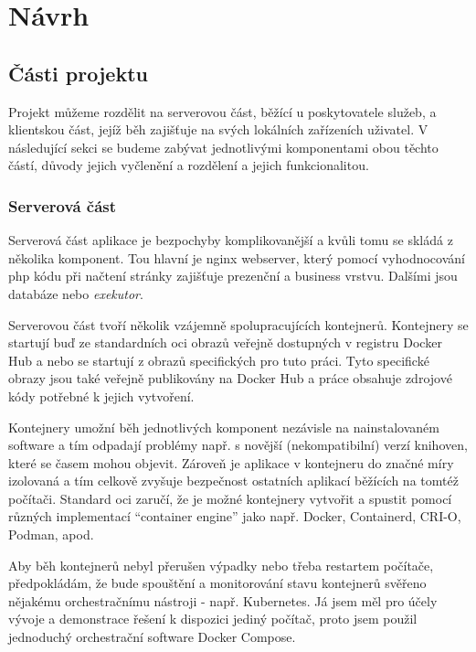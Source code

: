 \chapter{Návrh}

\section{Části projektu}
Projekt můžeme rozdělit na serverovou část, běžící u poskytovatele služeb, a klientskou část, jejíž běh zajišťuje na svých lokálních zařízeních uživatel. V následující sekci se budeme zabývat jednotlivými komponentami obou těchto částí, důvody jejich vyčlenění a rozdělení a jejich funkcionalitou.

\subsection{Serverová část}
Serverová část aplikace je bezpochyby komplikovanější a kvůli tomu se skládá z několika komponent. Tou hlavní je \acrshort{nginx} webserver, který pomocí vyhodnocování \acrshort{php} kódu při načtení stránky zajišťuje prezenční a business vrstvu. Dalšími jsou databáze nebo \emph{exekutor}.

Serverovou část tvoří několik vzájemně spolupracujících kontejnerů. Kontejnery se startují buď ze standardních \acrshort{oci} obrazů veřejně dostupných v registru Docker Hub a nebo se startují z obrazů specifických pro tuto práci. Tyto specifické obrazy jsou také veřejně publikovány na Docker Hub a práce obsahuje zdrojové kódy potřebné k jejich vytvoření. 

Kontejnery umožní běh jednotlivých komponent nezávisle na nainstalovaném software a tím odpadají problémy např. s novější (nekompatibilní) verzí knihoven, které se časem mohou objevit. Zároveň je aplikace v kontejneru do značné míry izolovaná a tím celkově zvyšuje bezpečnost ostatních aplikací běžících na tomtéž počítači. Standard \acrshort{oci} zaručí, že je možné kontejnery vytvořit a spustit pomocí různých implementací \enquote{container engine} jako např. Docker, Containerd, CRI-O, Podman, apod.

Aby běh kontejnerů nebyl přerušen výpadky nebo třeba restartem počítače, předpokládám, že bude spouštění a monitorování stavu kontejnerů svěřeno nějakému orchestračnímu nástroji - např. Kubernetes. Já jsem měl pro účely vývoje a demonstrace řešení k dispozici jediný počítač, proto jsem použil jednoduchý orchestrační software Docker Compose.

